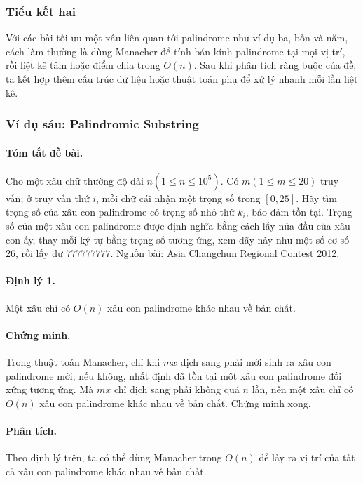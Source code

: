 \documentclass[11pt]{article}
\begin{document}
\subsubsection{Tiểu kết hai}

Với các bài tối ưu một xâu liên quan tới palindrome như ví dụ ba, bốn và năm,
cách làm thường là dùng Manacher để tính bán kính palindrome tại mọi vị trí,
rồi liệt kê tâm hoặc điểm chia trong \(O(n)\). Sau khi phân tích ràng buộc của
đề, ta kết hợp thêm cấu trúc dữ liệu hoặc thuật toán phụ để xử lý nhanh mỗi
lần liệt kê.

\subsubsection{Ví dụ sáu: Palindromic Substring}

\paragraph{Tóm tắt đề bài.}
Cho một xâu chữ thường độ dài \(n(1\le n\le10^5)\). Có \(m(1\le m\le20)\) truy
vấn; ở truy vấn thứ \(i\), mỗi chữ cái nhận một trọng số trong \([0,25]\). Hãy
tìm trọng số của xâu con palindrome có trọng số nhỏ thứ \(k_i\), bảo đảm tồn
tại. Trọng số của một xâu con palindrome được định nghĩa bằng cách lấy nửa đầu
của xâu con ấy, thay mỗi ký tự bằng trọng số tương ứng, xem dãy này như một số
cơ số \(26\), rồi lấy dư \(777777777\). Nguồn bài: Asia Changchun Regional
Contest 2012.

\paragraph{Định lý 1.}
Một xâu chỉ có \(O(n)\) xâu con palindrome khác nhau về bản chất.

\paragraph{Chứng minh.}
Trong thuật toán Manacher, chỉ khi \(mx\) dịch sang phải mới sinh ra xâu con
palindrome mới; nếu không, nhất định đã tồn tại một xâu con palindrome đối xứng
tương ứng. Mà \(mx\) chỉ dịch sang phải không quá \(n\) lần, nên một xâu chỉ có
\(O(n)\) xâu con palindrome khác nhau về bản chất. Chứng minh xong.

\paragraph{Phân tích.}
Theo định lý trên, ta có thể dùng Manacher trong \(O(n)\) để lấy ra vị trí của
tất cả xâu con palindrome khác nhau về bản chất.
\end{document}
